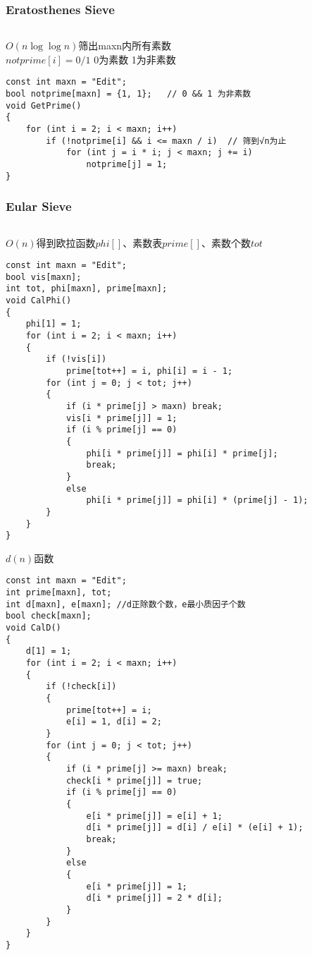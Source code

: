 \documentclass[twoside]{article}
\begin{document}
\subsubsection{Eratosthenes Sieve}
\begin{lstlisting}
\end{lstlisting}
$O(n\log\log n)$筛出maxn内所有素数\\
$notprime[i] = 0/1$ 0为素数 1为非素数\\
\begin{lstlisting}
const int maxn = "Edit";
bool notprime[maxn] = {1, 1};   // 0 && 1 为非素数
void GetPrime()
{
    for (int i = 2; i < maxn; i++)
        if (!notprime[i] && i <= maxn / i)  // 筛到√n为止
            for (int j = i * i; j < maxn; j += i)
                notprime[j] = 1;
}
\end{lstlisting}
\subsubsection{Eular Sieve}
\begin{lstlisting}
\end{lstlisting}
$O(n)$得到欧拉函数$phi[]$、素数表$prime[]$、素数个数$tot$\\
\begin{lstlisting}
const int maxn = "Edit";
bool vis[maxn];
int tot, phi[maxn], prime[maxn];
void CalPhi()
{
    phi[1] = 1;
    for (int i = 2; i < maxn; i++)
    {
        if (!vis[i])
            prime[tot++] = i, phi[i] = i - 1;
        for (int j = 0; j < tot; j++)
        {
            if (i * prime[j] > maxn) break;
            vis[i * prime[j]] = 1;
            if (i % prime[j] == 0)
            {
                phi[i * prime[j]] = phi[i] * prime[j];
                break;
            }
            else
                phi[i * prime[j]] = phi[i] * (prime[j] - 1);
        }
    }
}
\end{lstlisting}
$d(n)$函数
\begin{lstlisting}
const int maxn = "Edit";
int prime[maxn], tot;
int d[maxn], e[maxn]; //d正除数个数，e最小质因子个数
bool check[maxn];
void CalD()
{
    d[1] = 1;
    for (int i = 2; i < maxn; i++)
    {
        if (!check[i])
        {
            prime[tot++] = i;
            e[i] = 1, d[i] = 2; 
        }
        for (int j = 0; j < tot; j++)
        {
            if (i * prime[j] >= maxn) break;
            check[i * prime[j]] = true;
            if (i % prime[j] == 0)
            {
                e[i * prime[j]] = e[i] + 1;
                d[i * prime[j]] = d[i] / e[i] * (e[i] + 1);
                break;
            }
            else
            {
                e[i * prime[j]] = 1;
                d[i * prime[j]] = 2 * d[i];
            }
        }
    }
}
\end{lstlisting}
\end{document}
